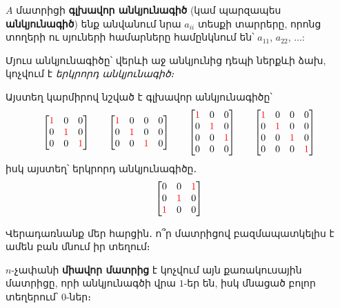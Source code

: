 \begin{definition}
$A$ մատրիցի \textbf{գլխավոր անկյունագիծ} (կամ պարզապես \textbf{անկյունագիծ}) ենք անվանում նրա $a_{ii}$ տեսքի տարրերը, որոնց տողերի ու սյուների համարները համընկնում են՝  $a_{11}$, $a_{22}$, $\dots$:
\end{definition}

Մյուս անկյունագիծը՝ վերևի աջ անկյունից դեպի ներքևի ձախ, կոչվում է \textit{երկրորդ անկյունագիծ։}

\begin{example}
Այստեղ կարմիրով նշված է գլխավոր անկյունագիծը՝
\[
{\displaystyle {\begin{bmatrix}\color {red}{1}&0&0\\0&\color {red}{1}&0\\0&0&\color {red}{1}\end{bmatrix}}\qquad {\begin{bmatrix}\color {red}{1}&0&0&0\\0&\color {red}{1}&0&0\\0&0&\color {red}{1}&0\end{bmatrix}}\qquad {\begin{bmatrix}\color {red}{1}&0&0\\0&\color {red}{1}&0\\0&0&\color {red}{1}\\0&0&0\end{bmatrix}}\qquad {\begin{bmatrix}\color {red}{1}&0&0&0\\0&\color {red}{1}&0&0\\0&0&\color {red}{1}&0\\0&0&0&\color {red}{1}\end{bmatrix}}}
\]
իսկ այստեղ՝ երկրորդ անկյունագիծը․
\[
{\displaystyle {\begin{bmatrix}0&0&\color {red}{1}\\0&\color {red}{1}&0\\\color {red}{1}&0&0\end{bmatrix}}}
\]
\end{example}

Վերադառնանք մեր հարցին․ ո՞ր մատրիցով բազմապատկելիս է ամեն բան մնում իր տեղում։

\begin{definition}
$n$-չափանի \textbf{միավոր մատրից} է կոչվում այն քառակուսային մատրիցը, որի անկյունագծի վրա $1$-եր են, իսկ մնացած բոլոր տեղերում՝ $0$-ներ։
\end{definition}


